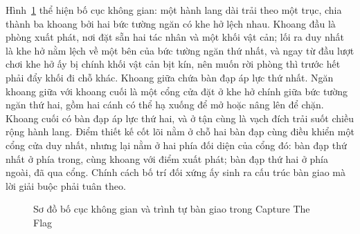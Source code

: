 \indent Hình~\ref{fig:puzzle_layout} thể hiện bố cục không gian: một hành lang dài trải
theo một trục, chia thành ba khoang bởi hai bức tường ngăn có khe hở lệch nhau. Khoang đầu
là phòng xuất phát, nơi đặt sẵn hai tác nhân và một khối vật cản; lối ra duy nhất là khe
hở nằm lệch về một bên của bức tường ngăn thứ nhất, và ngay từ đầu lượt chơi khe hở ấy bị
chính khối vật cản bịt kín, nên muốn rời phòng thì trước hết phải đẩy khối đi chỗ khác.
Khoang giữa chứa bàn đạp áp lực thứ nhất.
Ngăn khoang giữa với khoang cuối là một cổng cửa đặt ở khe hở chính giữa bức tường ngăn
thứ hai, gồm hai cánh có thể hạ xuống để mở hoặc nâng lên để chặn. Khoang cuối có bàn đạp
áp lực thứ hai, và ở tận cùng là vạch đích trải suốt chiều rộng hành lang. Điểm thiết kế
cốt lõi nằm ở chỗ hai bàn đạp cùng điều khiển một cổng cửa duy nhất, nhưng lại nằm ở hai phía
đối diện của cổng đó: bàn đạp thứ nhất ở phía trong, cùng khoang với điểm xuất phát;
bàn đạp thứ hai ở phía ngoài, đã qua cổng. Chính cách bố trí đối xứng ấy sinh ra cấu trúc
bàn giao mà lời giải buộc phải tuân theo.

\begin{figure}[H]
\centering
{}
\caption{Sơ đồ bố cục không gian và trình tự bàn giao trong Capture The Flag}
\label{fig:puzzle_layout}
\end{figure}

